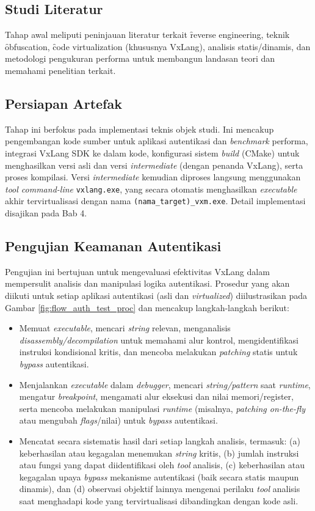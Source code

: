 \subsection{Studi Literatur}
Tahap awal meliputi peninjauan literatur terkait \f{reverse engineering}, teknik \f{obfuscation}, \f{code virtualization} (khususnya VxLang), analisis statis/dinamis, dan metodologi pengukuran performa untuk membangun landasan teori dan memahami penelitian terkait.

\subsection{Persiapan Artefak}
Tahap ini berfokus pada implementasi teknis objek studi. Ini mencakup pengembangan kode sumber untuk aplikasi autentikasi dan \textit{benchmark} performa, integrasi VxLang SDK ke dalam kode, konfigurasi sistem \textit{build} (CMake) untuk menghasilkan versi asli dan versi \textit{intermediate} (dengan penanda VxLang), serta proses kompilasi. Versi \textit{intermediate} kemudian diproses langsung menggunakan \textit{tool command-line} \texttt{vxlang.exe}, yang secara otomatis menghasilkan \textit{executable} akhir tervirtualisasi dengan nama \texttt{(nama\_target)\_vxm.exe}. Detail implementasi disajikan pada Bab 4.

\subsection{Pengujian Keamanan Autentikasi}
Pengujian ini bertujuan untuk mengevaluasi efektivitas VxLang dalam mempersulit analisis dan manipulasi logika autentikasi. Prosedur yang akan diikuti untuk setiap aplikasi autentikasi (asli dan \textit{virtualized}) diilustrasikan pada Gambar \ref{fig:flow_auth_test_proc} dan mencakup langkah-langkah berikut:
\begin{itemize}
    \item {} Memuat \textit{executable}, mencari \textit{string} relevan, menganalisis \textit{disassembly/decompilation} untuk memahami alur kontrol, mengidentifikasi instruksi kondisional kritis, dan mencoba melakukan \textit{patching} statis untuk \textit{bypass} autentikasi.
    \item {} Menjalankan \textit{executable} dalam \textit{debugger}, mencari \textit{string/pattern} saat \textit{runtime}, mengatur \textit{breakpoint}, mengamati alur eksekusi dan nilai memori/register, serta mencoba melakukan manipulasi \textit{runtime} (misalnya, \textit{patching on-the-fly} atau mengubah \textit{flags}/nilai) untuk \textit{bypass} autentikasi.
      \item {} Mencatat secara sistematis hasil dari setiap langkah analisis, termasuk: (a) keberhasilan atau kegagalan menemukan \textit{string} kritis, (b) jumlah instruksi atau fungsi yang dapat diidentifikasi oleh \textit{tool} analisis, (c) keberhasilan atau kegagalan upaya \textit{bypass} mekanisme autentikasi (baik secara statis maupun dinamis), dan (d) observasi objektif lainnya mengenai perilaku \textit{tool} analisis saat menghadapi kode yang tervirtualisasi dibandingkan dengan kode asli.
\end{itemize}

